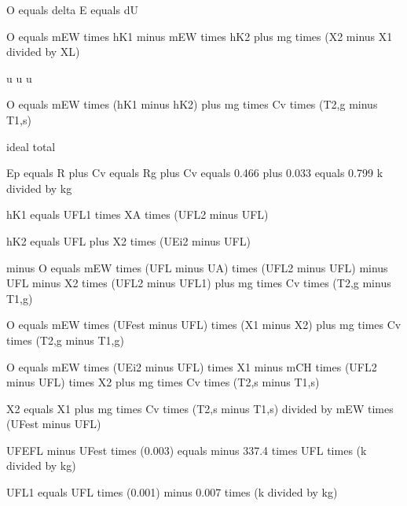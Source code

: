 O equals delta E equals dU

O equals mEW times hK1 minus mEW times hK2 plus mg times (X2 minus X1 divided by XL)

u u u

O equals mEW times (hK1 minus hK2) plus mg times Cv times (T2,g minus T1,s)

ideal total

Ep equals R plus Cv equals Rg plus Cv equals 0.466 plus 0.033 equals 0.799 k divided by kg

hK1 equals UFL1 times XA times (UFL2 minus UFL)

hK2 equals UFL plus X2 times (UEi2 minus UFL)

minus O equals mEW times (UFL minus UA) times (UFL2 minus UFL) minus UFL minus X2 times (UFL2 minus UFL1) plus mg times Cv times (T2,g minus T1,g)

O equals mEW times (UFest minus UFL) times (X1 minus X2) plus mg times Cv times (T2,g minus T1,g)

O equals mEW times (UEi2 minus UFL) times X1 minus mCH times (UFL2 minus UFL) times X2 plus mg times Cv times (T2,s minus T1,s)

X2 equals X1 plus mg times Cv times (T2,s minus T1,s) divided by mEW times (UFest minus UFL)

UFEFL minus UFest times (0.003) equals minus 337.4 times UFL times (k divided by kg)

UFL1 equals UFL times (0.001) minus 0.007 times (k divided by kg)
